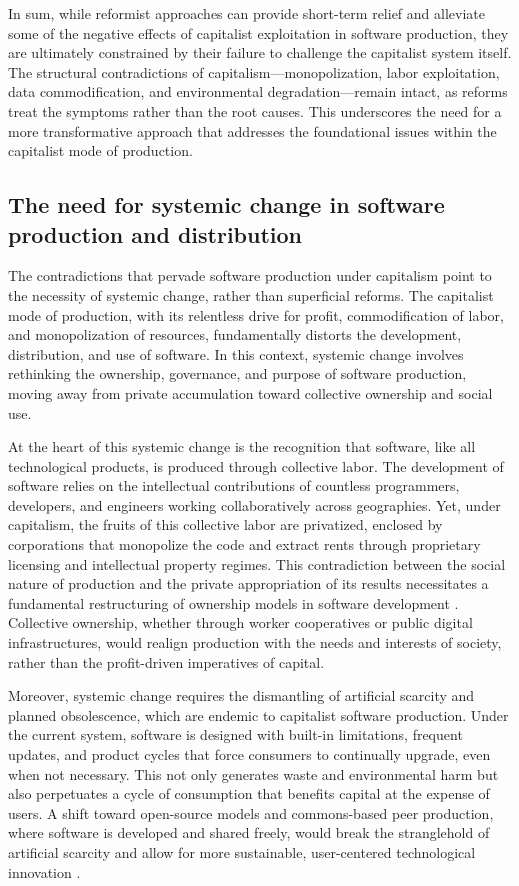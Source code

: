 In sum, while reformist approaches can provide short-term relief and alleviate some of the negative effects of capitalist exploitation in software production, they are ultimately constrained by their failure to challenge the capitalist system itself. The structural contradictions of capitalism—monopolization, labor exploitation, data commodification, and environmental degradation—remain intact, as reforms treat the symptoms rather than the root causes. This underscores the need for a more transformative approach that addresses the foundational issues within the capitalist mode of production.

\subsection{The need for systemic change in software production and distribution}

The contradictions that pervade software production under capitalism point to the necessity of systemic change, rather than superficial reforms. The capitalist mode of production, with its relentless drive for profit, commodification of labor, and monopolization of resources, fundamentally distorts the development, distribution, and use of software. In this context, systemic change involves rethinking the ownership, governance, and purpose of software production, moving away from private accumulation toward collective ownership and social use.

At the heart of this systemic change is the recognition that software, like all technological products, is produced through collective labor. The development of software relies on the intellectual contributions of countless programmers, developers, and engineers working collaboratively across geographies. Yet, under capitalism, the fruits of this collective labor are privatized, enclosed by corporations that monopolize the code and extract rents through proprietary licensing and intellectual property regimes. This contradiction between the social nature of production and the private appropriation of its results necessitates a fundamental restructuring of ownership models in software development \cite[pp.~45-47]{fuchs2015}. Collective ownership, whether through worker cooperatives or public digital infrastructures, would realign production with the needs and interests of society, rather than the profit-driven imperatives of capital.

Moreover, systemic change requires the dismantling of artificial scarcity and planned obsolescence, which are endemic to capitalist software production. Under the current system, software is designed with built-in limitations, frequent updates, and product cycles that force consumers to continually upgrade, even when not necessary. This not only generates waste and environmental harm but also perpetuates a cycle of consumption that benefits capital at the expense of users. A shift toward open-source models and commons-based peer production, where software is developed and shared freely, would break the stranglehold of artificial scarcity and allow for more sustainable, user-centered technological innovation \cite[pp.~151-154]{klein2002}.

